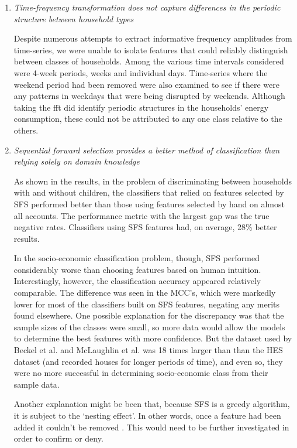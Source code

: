 \begin{enumerate}
\item \textit{Time-frequency transformation does not capture differences in the periodic structure between household types}

Despite numerous attempts to extract informative frequency amplitudes from time-series, we were unable to isolate features that could reliably distinguish between classes of households. Among the various time intervals considered were 4-week periods, weeks and individual days. Time-series where the weekend period had been removed were also examined to see if there were any patterns in weekdays that were being disrupted by weekends. Although taking the fft did identify periodic structures in the households' energy consumption, these could not be attributed to any one class relative to the others. 

\item \textit{Sequential forward selection provides a better method of classification than relying solely on domain knowledge}

As shown in the results, in the problem of discriminating between households with and without children, the classifiers that relied on features selected by SFS performed better than those using features selected by hand on almost all accounts. The performance metric with the largest gap was the true negative rates. Classifiers using SFS features had, on average, 28\% better results. 

In the socio-economic classification problem, though, SFS performed considerably worse than choosing features based on human intuition.  Interestingly, however, the classification accuracy appeared relatively comparable.  The difference was seen in the MCC's, which were markedly lower for most of the classifiers built on SFS features, negating any merits found elsewhere. One possible explanation for the discrepancy was that the sample sizes of the classes were small, so more data would allow the models to determine the best features with more confidence.  But the dataset used by Beckel et al. and McLaughlin et al. was 18 times larger than than the HES dataset (and recorded houses for longer periods of time), and even so, they were no more successful in determining socio-economic class from their sample data.
 
Another explanation might be been that, because SFS is a greedy algorithm, it is subject to the `nesting effect'.  In other words, once a feature had been added it couldn't be removed \cite{Guyon}. This would need to be further investigated in order to confirm or deny.


\end{enumerate}
